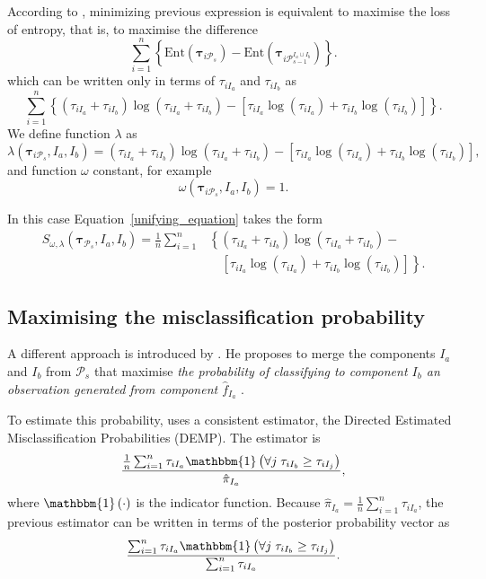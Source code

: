 \documentclass[submit]{smj}
\theoremstyle{definition}
\newcommand{\m}[1]{\boldsymbol{#1}}
\begin{document}
According to \cite{baudry2010combining}, minimizing previous expression is equivalent to maximise the loss of entropy, that is, to maximise the difference
\[
\sum_{i=1}^n  \left\{ \text{Ent}( \m\tau_{i \mathcal{P}_s} ) - \text{Ent}( \m\tau_{i \mathcal{P}_{s-1}^{I_a\cup I_b}} ) \right\}.
\]
which can be written only in terms of $\tau_{i I_a}$  and $\tau_{i I_b}$ as
\begin{equation}\label{entropy}
\sum_{i=1}^n   \left\{(\tau_{iI_a}+\tau_{iI_b}) \log(\tau_{iI_a} + \tau_{iI_b}) - \left[\tau_{iI_a} \log(\tau_{iI_a}) + \tau_{iI_b} \log(\tau_{iI_b})\right] \right\}.
\end{equation}
We define function $\lambda$ as
\[
\lambda(\m\tau_{i \mathcal{P}_s},  I_a,  I_b) =  (\tau_{iI_a}+\tau_{iI_b}) \log(\tau_{iI_a} + \tau_{iI_b}) - \left[ \tau_{iI_a} \log(\tau_{iI_a}) + \tau_{iI_b} \log(\tau_{iI_b}) \right],
\]
and function $\omega$ constant, for example 
\[
\omega(\m\tau_{i \mathcal{P}_s},  I_a,  I_b) = 1.
\]

In this case Equation~\ref{unifying_equation} takes the form
\[
\begin{split}
S_{\omega, \lambda}( \m\tau_{\mathcal{P}_s},  I_a,  I_b) = \frac{1}{n} \sum_{i=1}^n & \left\{(\tau_{iI_a}+\tau_{iI_b}) \log(\tau_{iI_a} + \tau_{iI_b}) - \right.\\ 
&\quad \left.\left[ \tau_{iI_a} \log(\tau_{iI_a}) + \tau_{iI_b} \log(\tau_{iI_b}) \right]\right\}.
\end{split}
\]


\subsection{Maximising the misclassification probability}
\label{missclassification_section}

A different approach is introduced by \cite{hennig2010methods}. He proposes to merge the components $I_a$ and $I_b$ from $ \mathcal{P}_s$ that maximise \emph{the probability of classifying to component $I_b$ an observation generated from component $\hat{f}_{I_a}$ }.

To estimate this probability,  \cite{hennig2010methods} uses a consistent estimator, the Directed Estimated Misclassification Probabilities (DEMP). The estimator is
\[
\frac{ \frac{1}{n} \sum_{i=1}^n {\tau_{iI_a} \mathbbm{1}\left( \forall j\; \tau_{i I_{b}} \geq \tau_{iI_j} \right)}}{ \hat{\pi}_{I_a}},
\]
where $\mathbbm{1}\left( \cdot \right)$ is the indicator function. Because $ \hat{\pi}_{I_a} = \frac{1}{n} \sum_{i=1}^n \tau_{iI_a}$, the previous estimator can be written in terms of the posterior probability vector as
\begin{equation}\label{demp_criteria}
\frac{ \sum_{i=1}^n {\tau_{iI_a} \mathbbm{1}\left( \forall j\; \tau_{i I_{b}} \geq \tau_{iI_j} \right)}}{\sum_{i=1}^n \tau_{iI_a} }.
\end{equation}
\end{document}
